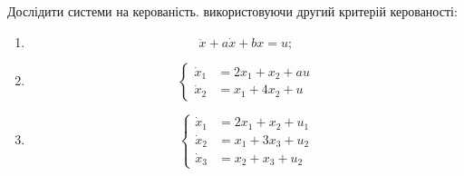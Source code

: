 \begin{problem}
    Дослідити системи на керованість. використовуючи другий критерій керованості:
    \begin{enumerate}
        \item \[\ddot x + a \dot x + b x = u; \]
        \item \[ \left\{ \begin{aligned} \dot x_1 &= 2x_1 + x_2 + au \\ \dot x_2 &= x_1 + 4 x_2 + u \end{aligned} \right. \]
        \item \[ \left\{ \begin{aligned} \dot x_1 &= 2x_1 + x_2 + u_1 \\ \dot x_2 &= x_1 + 3 x_3 + u_2 \\ \dot x_3 &= x_2 + x_3 + u_2  \end{aligned} \right. \]
    \end{enumerate}
\end{problem}


